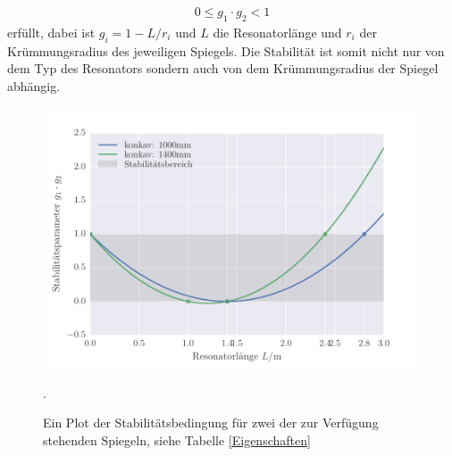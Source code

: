 \begin{align}
0\le g_1\cdot g_2 < 1
\end{align}
erfüllt, dabei ist $g_i=1-L/r_i$ und $L$ die Resonatorlänge und $r_i$ der Krümmungsradius des jeweiligen Spiegels. Die Stabilität ist somit nicht nur von dem Typ des Resonators sondern auch von dem Krümmungsradius der Spiegel abhängig.
\begin{figure}
\centering
\includegraphics[scale=1]{../Grafiken/Stabilitaetsparameter.pdf}
\caption{Ein Plot der Stabilitätsbedingung für zwei der zur Verfügung stehenden Spiegeln, siehe Tabelle \ref{Eigenschaften}\label{Stabilität}}.
\end{figure}
